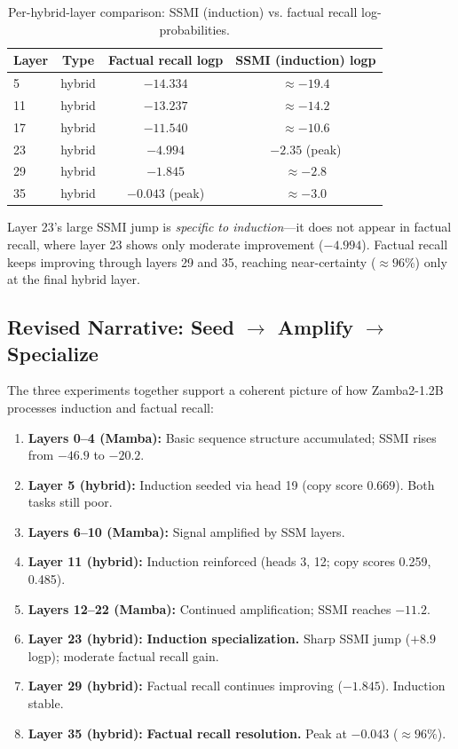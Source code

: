 \documentclass[11pt,a4paper]{article}
\begin{document}
\begin{table}[H]
  \centering
  \caption{Per-hybrid-layer comparison: SSMI (induction) vs. factual recall log-probabilities.}
  \label{tab:comparison}
  \begin{tabular}{lccc}
    \toprule
    Layer & Type & Factual recall logp & SSMI (induction) logp \\
    \midrule
    5  & hybrid & $-14.334$ & ${\approx}-19.4$ \\
    11 & hybrid & $-13.237$ & ${\approx}-14.2$ \\
    17 & hybrid & $-11.540$ & ${\approx}-10.6$ \\
    23 & hybrid & $-4.994$  & $\mathbf{-2.35}$ (peak) \\
    29 & hybrid & $-1.845$  & ${\approx}-2.8$ \\
    35 & hybrid & $\mathbf{-0.043}$ (peak) & ${\approx}-3.0$ \\
    \bottomrule
  \end{tabular}
\end{table}

Layer 23's large SSMI jump is \emph{specific to induction}---it does not appear in factual recall, where layer 23 shows only moderate improvement ($-4.994$). Factual recall keeps improving through layers 29 and 35, reaching near-certainty (${\approx}96\%$) only at the final hybrid layer.

\subsection{Revised Narrative: Seed $\to$ Amplify $\to$ Specialize}

The three experiments together support a coherent picture of how Zamba2-1.2B processes induction and factual recall:

\begin{enumerate}[leftmargin=1.5em]
  \item \textbf{Layers 0--4 (Mamba):} Basic sequence structure accumulated; SSMI rises from $-46.9$ to $-20.2$.
  \item \textbf{Layer 5 (hybrid):} Induction seeded via head 19 (copy score 0.669). Both tasks still poor.
  \item \textbf{Layers 6--10 (Mamba):} Signal amplified by SSM layers.
  \item \textbf{Layer 11 (hybrid):} Induction reinforced (heads 3, 12; copy scores 0.259, 0.485).
  \item \textbf{Layers 12--22 (Mamba):} Continued amplification; SSMI reaches $-11.2$.
  \item \textbf{Layer 23 (hybrid):} \textbf{Induction specialization.} Sharp SSMI jump ($+8.9$ logp); moderate factual recall gain.
  \item \textbf{Layer 29 (hybrid):} Factual recall continues improving ($-1.845$). Induction stable.
  \item \textbf{Layer 35 (hybrid):} \textbf{Factual recall resolution.} Peak at $-0.043$ (${\approx}96\%$).
\end{enumerate}
\end{document}
